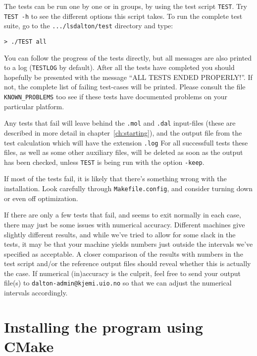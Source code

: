 The tests can be run one by one or in groups, by using the test script
\verb|TEST|. Try \verb|TEST -h| to see the different options this
script takes. 
To run the
complete test suite, go to the \verb|.../lsdalton/test| directory and
type:
\begin{verbatim}
> ./TEST all
\end{verbatim}
You can follow the progress of the tests directly, but all messages
are also printed to a log (\verb|TESTLOG| by default). After all the
tests have completed you should hopefully be presented with the
message ``ALL TESTS ENDED PROPERLY!''. If not, the complete list of 
failing test-cases
will be printed. Please consult the file
\verb|KNOWN_PROBLEMS| too see if these tests have documented problems
on your particular platform. 

Any tests that fail will leave behind the \verb|.mol| and \verb|.dal|
input-files (these are described in more detail in
chapter~\ref{ch:starting}), and the output file from the test
calculation which will have the extension \verb|.log| 
For all
successfull tests these files, as well as some other auxiliary files,
will be deleted as soon as the output has been checked, unless
\verb|TEST| is being run with the option \verb|-keep|.

If most of the tests fail, it is likely that there's something
wrong with the installation. Look carefully through
\verb|Makefile.config|, and consider turning down or even off
optimization.

If there are only a few tests that fail, and {\lsdalton} seems to exit
normally in each case, there may just be some issues with numerical
accuracy. Different machines give slightly different results, and
while we've tried to allow for some slack in the tests, it may be
that your machine yields numbers just outside the intervals we've
specified as acceptable. A closer comparison of the results with
numbers in the test script and/or the reference output files should
reveal whether this is actually the case. If numerical (in)accuracy is
the culprit, feel free to send your output file(s) to
\verb|dalton-admin@kjemi.uio.no| so that we can adjust the numerical
intervals accordingly.

\section{Installing the program using CMake}\label{sec:CMake}

